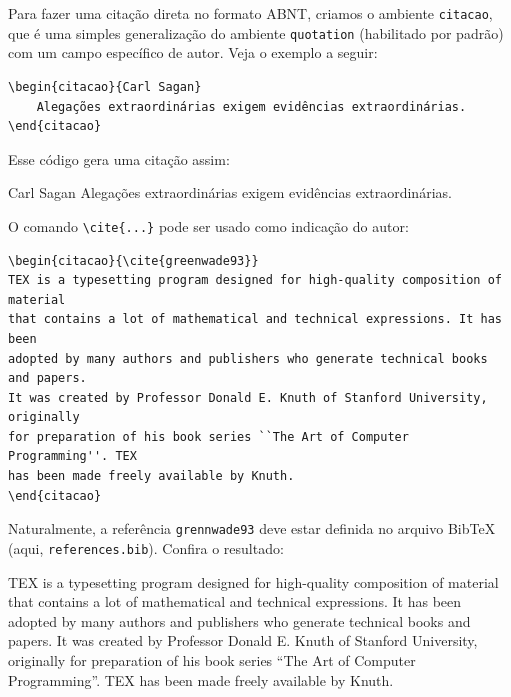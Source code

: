 Para fazer uma citação direta no formato ABNT, criamos o ambiente \verb|citacao|, que é uma simples generalização do ambiente \verb|quotation| (habilitado por padrão) com um campo específico de autor. Veja o exemplo a seguir:
\begin{verbatim}
\begin{citacao}{Carl Sagan}
    Alegações extraordinárias exigem evidências extraordinárias.
\end{citacao}
\end{verbatim}
Esse código gera uma citação assim:
\begin{citacao}{Carl Sagan}
    Alegações extraordinárias exigem evidências extraordinárias.
\end{citacao}
O comando \verb|\cite{...}| pode ser usado como indicação do autor:
\begin{verbatim}
\begin{citacao}{\cite{greenwade93}}
TEX is a typesetting program designed for high-quality composition of material
that contains a lot of mathematical and technical expressions. It has been 
adopted by many authors and publishers who generate technical books and papers. 
It was created by Professor Donald E. Knuth of Stanford University, originally 
for preparation of his book series ``The Art of Computer Programming''. TEX 
has been made freely available by Knuth.
\end{citacao}
\end{verbatim}
Naturalmente, a referência \verb|grennwade93| deve estar definida no arquivo BibTeX (aqui, \verb|references.bib|). Confira o resultado:
\begin{citacao}{\cite{greenwade93}}
TEX is a typesetting program designed for high-quality composition of material that contains a lot of mathematical and technical expressions. It has been adopted by many authors and publishers who generate technical books and papers. It was created by Professor Donald E. Knuth of Stanford University, originally for preparation of his book series ``The Art of Computer Programming''. TEX has been made freely available by Knuth.
\end{citacao}